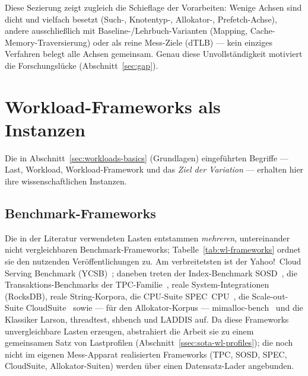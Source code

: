 Diese Sezierung zeigt zugleich die Schieflage der Vorarbeiten: Wenige Achsen sind dicht und vielfach
besetzt (Such-, Knotentyp-, Allokator-, Prefetch-Achse), andere ausschließlich mit
Baseline-/Lehrbuch-Varianten (Mapping, Cache-Memory-Traversierung) oder als reine Mess-Ziele (dTLB)
--- kein einziges Verfahren belegt alle Achsen gemeinsam. Genau diese Unvollständigkeit motiviert
die Forschungslücke (Abschnitt~\ref{sec:gap}).


\section{Workload-Frameworks als Instanzen}\label{sec:sota-workloads}
Die in Abschnitt~\ref{sec:workloads-basics} (Grundlagen) eingeführten Begriffe --- Last, Workload,
Workload-Framework und das \emph{Ziel der Variation} --- erhalten hier ihre wissenschaftlichen
Instanzen.

\subsection{Benchmark-Frameworks}\label{ssec:sota-wl-frameworks}
Die in der Literatur verwendeten Lasten entstammen \emph{mehreren}, untereinander nicht
vergleichbaren Benchmark-Frameworks; Tabelle~\ref{tab:wl-frameworks} ordnet sie den nutzenden
Veröffentlichungen zu. Am verbreitetsten ist der Yahoo!\ Cloud Serving Benchmark
(YCSB)~\cite{cooper2010ycsb}; daneben treten der Index-Benchmark SOSD~\cite{kipf2019sosd}, die
Transaktions-Benchmarks der TPC-Familie~\cite{tpc_benchmarks}, reale System-Integrationen (RocksDB),
reale String-Korpora, die CPU-Suite SPEC~CPU~\cite{spec_cpu2017}, die Scale-out-Suite
CloudSuite~\cite{ferdman2012cloudsuite} sowie --- für den Allokator-Korpus ---
mimalloc-bench~\cite{mimalloc_bench} und die Klassiker Larson, threadtest, shbench und LADDIS auf.
Da diese Frameworks unvergleichbare Lasten erzeugen, abstrahiert die Arbeit sie zu einem gemeinsamen
Satz von Lastprofilen (Abschnitt~\ref{ssec:sota-wl-profiles}); die noch nicht im eigenen
Mess-Apparat realisierten Frameworks (TPC, SOSD, SPEC, CloudSuite, Allokator-Suiten) werden über
einen Datensatz-Lader angebunden.

